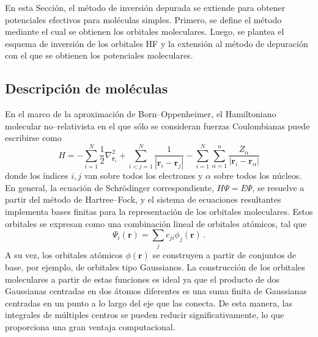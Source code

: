 En esta Sección, el método de inversión depurada se extiende para 
obtener potenciales efectivos para moléculas simples. Primero, se define 
el método mediante el cual se obtienen los orbitales moleculares. Luego, 
se plantea el esquema de inversión de los orbitales HF y la extensión al 
método de depuración con el que se obtienen los potenciales moleculares.

\subsection{Descripción de moléculas}
\label{sec:moleculas}

En el marco de la aproximación de Born--Oppenheimer, el Hamiltoniano 
molecular no--relativista en el que sólo se consideran fuerzas 
Coulombianas puede escribirse como
\begin{equation}
H=-\sum_{i=1}^N \frac{1}{2} \nabla^2_{\mathbf{r}_i} 
  +\sum_{i<j=1}^N \frac{1}{\left|\mathbf{r}_i-\mathbf{r}_j\right|} 
  -\sum_{i=1}^N \sum_{\alpha=1}^n \frac{Z_{\alpha}}{
    \left|\mathbf{r}_i-\mathbf{r}_{\alpha}\right|} 
\label{eq:BOhamiltonian}
\end{equation}
donde los índices $i,j$ van sobre todos los electrones y $\alpha$ 
sobre todos los núcleos. En general, la ecuación de Schr\"odinger 
correspondiente, $H\Psi=E\Psi$, se resuelve a partir del método de 
Hartree--Fock, y el sistema de ecuaciones resultantes implementa bases 
finitas para la representación de los orbitales moleculares. Estos 
orbitales se expresan como una combinación lineal de orbitales atómicos, 
tal que
\begin{equation}
\Psi_i(\mathbf{r})=\sum_j c_{ji} \phi_j(\mathbf{r})\,.
\end{equation}
A su vez, los orbitales atómicos $\phi(\mathbf{r})$ se construyen a 
partir de conjuntos de base, por ejemplo, de orbitales tipo Gaussianos. 
La construcción de los orbitales moleculares a partir de estas funciones 
es ideal ya que el producto de dos Gaussianas centradas en dos átomos 
diferentes es una suma finita de Gaussianas centradas en un punto a lo 
largo del eje que las conecta. De esta manera, las integrales de 
múltiples centros se pueden reducir significativamente, lo que 
proporciona una gran ventaja computacional.

